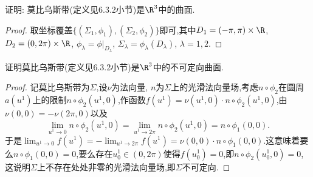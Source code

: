 	\begin{excise}
		证明: 莫比乌斯带(定义见6.3.2小节)是$\R^{3}$中的曲面.
	\end{excise}
	\begin{proof}
		取坐标覆盖$\{(\Sigma_{1},\phi_{1}),(\Sigma_{2},\phi_{2})\}$即可,其中$D_{1}=(-\pi,\pi)\times\R$, $D_{2}=(0,2\pi)\times\R$, $\phi_{\lambda}=\phi\bigr|_{D_{\lambda}}$, $\Sigma_{\lambda}=\phi_{\lambda}(D_{\lambda})$, $\lambda=1,2$.
	\end{proof}
	\begin{excise}
		证明莫比乌斯带(定义见6.3.2小节)是$\R^{3}$中的不可定向曲面.
	\end{excise}
	\begin{proof}
		记莫比乌斯带为$\Sigma$,设$\nu$为法向量, $n$为$\Sigma$上的光滑法向量场,考虑$n\circ\phi_{2}$在圆周$a(u^{1})$上的限制$n\circ\phi_{2}(u^{1},0)$,作函数$f(u^{1})=\nu(u^{1},0)\cdot n\circ\phi_{2}(u^{1},0)$,由$\nu(0,0)=-\nu(2\pi,0)$以及
		$$\displaystyle \lim_{u^{1}\to0}n\circ\phi_{2}(u^{1},0)=\lim_{u^{1}\to 2\pi}n\circ\phi_{2}(u^{1},0)=n\circ\phi_{1}(0,0).
		$$
		于是$\displaystyle \lim_{u^{1}\to0}f(u^{1})=-\lim_{u^{1}\to2\pi}f(u^{1})=\nu(0,0)\cdot n\circ\phi_{1}(0,0)$.这意味着要么$n\circ\phi_{1}(0,0)=0$,要么存在$u_{0}^{1}\in(0,2\pi)$使得$f(u_{0}^{1})=0$,即$n\circ\phi_{2}(u_{0}^{1},0)=0$,这说明$\Sigma$上不存在处处非零的光滑法向量场,即$\Sigma$不可定向.
	\end{proof}

